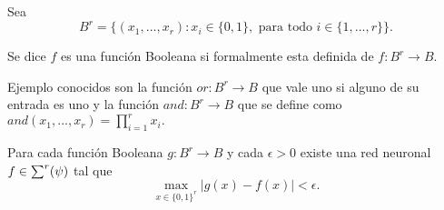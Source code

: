 \begin{definicion}
    Sea 
    \begin{equation}
        B^r = \{
            (x_1, ..., x_r) : x_i \in \{0,1\}, 
            \text{ para todo } i \in \{1,..., r\}
            \}.
    \end{equation}

    Se dice $f$ es una función Booleana 
    si formalmente esta definida de $f:B^r \longrightarrow B$. 
\end{definicion}
Ejemplo conocidos son la función $or: B^r \longrightarrow B$  que vale 
uno si alguno de su entrada es uno y la función 
$and: B^r \longrightarrow B$
que se define como $and(x_1, ..., x_r) = \prod_{i=1}^r x_i.$

\begin{corolario}
    Para cada función Booleana $g: B^r \longrightarrow B$ y 
    cada $\epsilon >0$ existe una red neuronal
    $f \in \sum^r (\psi)$ tal que 
    \begin{equation}
        \max_{x \in \{ 0,1\}^r} |g(x) - f(x)|
        < \epsilon.
    \end{equation}
\end{corolario}
